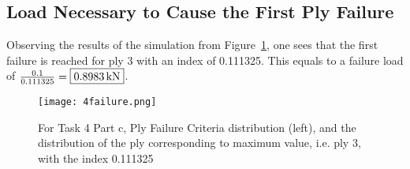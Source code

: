 \documentclass[a4paper,twosided,11pt,DIV14]{scrartcl}
\begin{document}
\subsection{Load Necessary to Cause the First Ply Failure}

Observing the results of the simulation from Figure~\ref{fig:43}, one sees that
the first failure is reached for ply 3 with an index of 0.111325.
This equals to a failure load of $\frac{0.1}{0.111325} = \fbox{\SI{0.8983}{kN}}$.

\begin{figure}[H]
\begin{center}
  \texttt{[image: 4failure.png]}
\end{center}
\caption{For Task 4 Part c, Ply Failure Criteria distribution (left), and the
  distribution of the ply corresponding to maximum value, i.e. ply 3, with the index
  0.111325}
\label{fig:43}
\end{figure}
\end{document}
